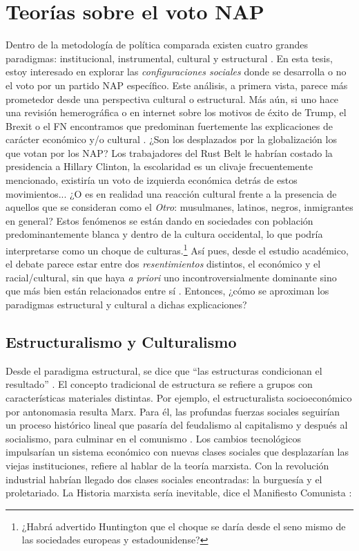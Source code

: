 \chapter{Teorías sobre el voto NAP}

Dentro de la metodología de política comparada existen cuatro grandes paradigmas: institucional, instrumental, cultural y estructural \parencite{Uribe16}. En esta tesis, estoy interesado en explorar las \textit{configuraciones sociales} donde se desarrolla o no el voto por un partido NAP específico. Este análisis, a primera vista, parece más prometedor desde una perspectiva cultural o estructural. Más aún, si uno hace una revisión hemerográfica o en internet sobre los motivos de éxito de Trump, el Brexit o el FN encontramos que predominan fuertemente las explicaciones de carácter económico y/o cultural \parencites{Beauchamp16a}{Beauchamp16b}{Carney16}{Tesler16}{Sides16} {Arnade16}. ¿Son los desplazados por la globalización los que votan por los NAP? Los trabajadores del Rust Belt le habrían costado la presidencia a Hillary Clinton, la escolaridad es un clivaje frecuentemente mencionado, existiría un voto de izquierda económica detrás de estos movimientos... ¿O es en realidad una reacción cultural frente a la presencia de aquellos que se consideran como el \textit{Otro}: musulmanes, latinos, negros, inmigrantes en general? Estos fenómenos se están dando en sociedades con población predominantemente blanca y dentro de la cultura occidental, lo que podría interpretarse como un choque de culturas.\footnote{¿Habrá advertido Huntington que el choque se daría desde el seno mismo de las sociedades europeas y estadounidense?} Así pues, desde el estudio académico, el debate parece estar entre dos \textit{resentimientos} distintos, el económico y el racial/cultural, sin que haya \textit{a priori} uno incontroversialmente dominante sino que más bien están relacionados entre sí \parencites{Inglehart16}{Ivarsflaten14}. Entonces, ¿cómo se aproximan los paradigmas estructural y cultural a dichas explicaciones?\\  

\section{Estructuralismo y Culturalismo} 

Desde el paradigma estructural, se dice que ``las estructuras condicionan el resultado'' \parencite[69]{BV08}. El concepto tradicional de estructura se refiere a grupos con características materiales distintas. Por ejemplo, el estructuralista socioeconómico por antonomasia resulta Marx. Para él, las profundas fuerzas sociales seguirían un proceso histórico lineal que pasaría del feudalismo al capitalismo y después al socialismo, para culminar en el comunismo \parencite{BV08}. Los cambios tecnológicos impulsarían un sistema económico con nuevas clases sociales que desplazarían las viejas instituciones, refiere \textcite{Heilbroner92} al hablar de la teoría marxista. Con la revolución industrial habrían llegado dos clases sociales encontradas: la burguesía y el proletariado. La Historia marxista sería inevitable, dice el Manifiesto Comunista \parencite[148]{Heilbroner92}: 

